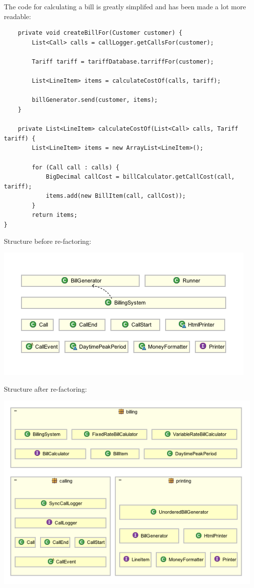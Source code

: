 \documentclass[a4paper,11pt]{article}
\begin{document}
The code for calculating a bill is greatly simplifed and has been made a lot more readable:
\begin{verbatim}
    private void createBillFor(Customer customer) {
        List<Call> calls = callLogger.getCallsFor(customer);

        Tariff tariff = tariffDatabase.tarriffFor(customer);

        List<LineItem> items = calculateCostOf(calls, tariff);

        billGenerator.send(customer, items);
    }

    private List<LineItem> calculateCostOf(List<Call> calls, Tariff tariff) {
        List<LineItem> items = new ArrayList<LineItem>();

        for (Call call : calls) {
            BigDecimal callCost = billCalculator.getCallCost(call, tariff);
            items.add(new BillItem(call, callCost));
        }
        return items;
}
\end{verbatim}
\pagebreak

Structure before re-factoring:
\begin{center}
\includegraphics[scale=0.75]{images/original_structure.png}
\end{center}

Structure after re-factoring:
\begin{center}
\includegraphics[scale=0.75]{images/new_structure.png}
\end{center}
\end{document}
